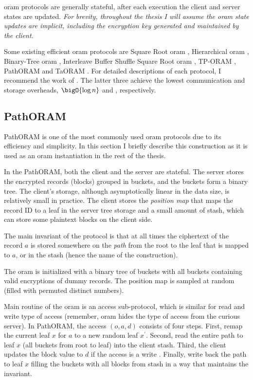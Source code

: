 		\acrshort{oram} protocols are generally stateful, after each execution the client and server states are updated.
		\emph{For brevity, throughout the thesis I will assume the \acrshort{oram} state updates are implicit, including the encryption key generated and maintained by the client.}

		Some existing efficient \acrshort{oram} protocols are Square Root \acrshort{oram} \cite{oram-theory}, Hierarchical \acrshort{oram} \cite{oram-original}, Binary-Tree \acrshort{oram} \cite{binary-tree-oram}, Interleave Buffer Shuffle Square Root \acrshort{oram} \cite{shortest-path-oram}, TP-ORAM \cite{tp-oram}, PathORAM \cite{path-oram} and TaORAM \cite{taostore}.
		For detailed descriptions of each protocol, I recommend the work of \textcite{oram-survey-feifei}.
		The latter three  achieve the lowest communication and storage overheads, $\bigO{\log \dataSize}$ and \bigO{\dataSize}, respectively.

		\subsection{PathORAM}

			PathORAM \cite{path-oram} is one of the most commonly used \acrshort{oram} protocols due to its efficiency and simplicity.
			In this section I briefly describe this construction as it is used as an \acrshort{oram} instantiation in the rest of the thesis.

			In the PathORAM, both the client \client{} and the server \server{} are stateful.
			The server stores the encrypted records (blocks) grouped in buckets, and the buckets form a binary tree.
			The client's storage, although asymptotically linear in the data size, is relatively small in practice.
			The client stores the \emph{position map} that maps the record ID to a leaf in the server tree storage and a small amount of stash, which can store some plaintext blocks on the client side.

			The main invariant of the protocol is that at all times the ciphertext of the record $a$ is stored somewhere on the \emph{path} from the root to the leaf that is mapped to $a$, or in the stash (hence the name of the construction).

			The \acrshort{oram} is initialized with a binary tree of buckets with all buckets containing valid encryptions of dummy records.
			The position map is sampled at random (filled with permuted distinct numbers).

			Main routine of the \acrshort{oram} is an access sub-protocol, which is similar for read \oramRead{} and write \oramWrite{} type of access (remember, \acrshort{oram} hides the type of access from the curious server).
			In PathORAM, the access $(o, a, d)$ consists of four steps.
			First, remap the current leaf $x$ for $a$ to a new random leaf $x^\prime$.
			Second, read the entire path to leaf $x$ (all buckets from root to leaf) into the client stash.
			Third, the client updates the block value to $d$ if the access is a write \oramWrite{}.
			Finally, write back the path to leaf $x$ filling the buckets with all blocks from stash in a way that maintains the invariant.

